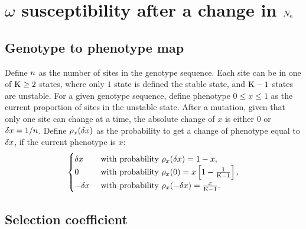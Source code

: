 \section{\texorpdfstring{$\omega$}{ω} susceptibility after a change in \texorpdfstring{$N_{\mathrm{e}}$}{Nₑ}}
\label{sec:susceptibility-after-a-change-in-Ne}

\subsection{Genotype to phenotype map}
\label{subsec:genotype-to-phenotype-map}

Define $n$ as the number of sites in the genotype sequence.
Each site can be in one of $\text{K} \geq 2$ states, where only $1$ state is defined the stable state, and $\text{K} - 1$ states are unstable.
For a given genotype sequence, define phenotype $0 \leq x \leq 1$ as the current proportion of sites in the unstable state.
After a mutation, given that only one site can change at a time, the absolute change of $x$ is either $0$ or $\delta x=1/n$.
Define $\rho_{x}(\delta x)$ as the probability to get a change of phenotype equal to $\delta x$, if the current phenotype is $x$:\\
\begin{gather}
\begin{cases}
\delta x &\text{ with probability } \rho_{x}(\delta x) = 1-x, \\
0 &\text{ with probability } \rho_{x}(0) = x \left[1 - \frac{1}{\text{K} - 1}\right], \\
-\delta x &\text{ with probability } \rho_{x}(-\delta x) = \frac{x}{\text{K} - 1}.\\
\end{cases} \label{eq:proba-pheno}
\end{gather}

\subsection{Selection coefficient}
\label{subsec:selection-coefficient}

